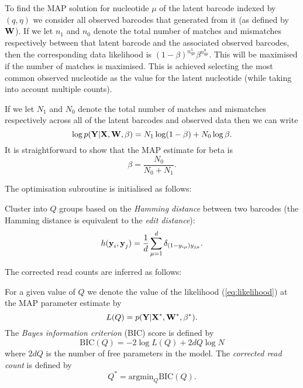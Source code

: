 To find the MAP solution for nucleotide $\mu$ of the latent barcode indexed by $(q,\eta)$ we consider all observed barcodes that generated from it (as defined by $\boldsymbol{\mathbf{W}}$). If we let $n_1$ and $n_0$ denote the total number of matches and mismatches respectively between that latent barcode and the associated observed barcodes, then the corresponding data likelihood is $(1-\beta)^{n^1_{q\mu}}\beta^{n^0_{q\mu}}$. This will be maximised if the number of matches is maximised. This is achieved selecting the most common observed nucleotide as the value for the latent nucleotide (while taking into account multiple counts).

If we let $N_1$ and $N_0$ denote the total number of matches and mismatches respectively across all of the latent barcodes and observed data then we can write 
\begin{equation}
\log p(\boldsymbol{\mathbf{Y}}|\boldsymbol{\mathbf{X}},\boldsymbol{\mathbf{W}},\beta) = N_1 \log(1-\beta) + N_0\log\beta.
\end{equation}
It is straightforward to show that the MAP estimate for beta is
\begin{equation}
\beta = \frac{N_0}{N_0+N_1}.
\end{equation}


The optimisation subroutine is initialised as follows:

Cluster into $Q$ groups based on the \emph{Hamming distance} between two barcodes (the Hamming distance is equivalent to the \emph{edit distance}):
\begin{equation}
h(\boldsymbol{\mathbf{y}}_i,\boldsymbol{\mathbf{y}}_j) = \frac{1}{d}\sum_{\mu=1}^{d}\delta_{(1-y_{i\mu})y_{j\mu}}.
\end{equation}


The corrected read counts are inferred as follows:

For a given value of $Q$ we denote the value of the likelihood (\ref{eq:likelihood}) at the MAP parameter estimate by
\begin{equation}
L(Q) = p(\boldsymbol{\mathbf{Y}}|\boldsymbol{\mathbf{X}}^*,\boldsymbol{\mathbf{W}}^*,\beta^*).
\end{equation}
The \emph{Bayes information criterion} (BIC) score is defined by
\begin{equation}
\text{BIC}(Q) = -2\log L(Q) + 2dQ\log N
\end{equation}
where $2dQ$ is the number of free parameters in the model. The \emph{corrected read count} is defined by
\begin{equation}
Q^* = \text{argmin}_Q \text{BIC}(Q).
\end{equation}


